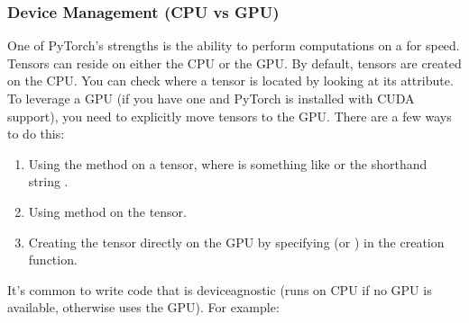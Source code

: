 \documentclass[letterpaper,10pt,english]{jupyterBook}
\begin{document}
\subsubsection{Device Management (CPU vs GPU)}
\label{\detokenize{04:device-management-cpu-vs-gpu}}
\sphinxAtStartPar
One of PyTorch’s strengths is the ability to perform computations on a  for speed. Tensors can reside on either the CPU or the GPU. By default, tensors are created on the CPU.
You can check where a tensor is located by looking at its  attribute. To leverage a GPU (if you have one and PyTorch is installed with CUDA support), you need to explicitly move tensors to the GPU. There are a few ways to do this:
\begin{enumerate}
%
\item {} 
\sphinxAtStartPar
Using the  method on a tensor, where  is something like  or the shorthand string .

\item {} 
\sphinxAtStartPar
Using  method on the tensor.

\item {} 
\sphinxAtStartPar
Creating the tensor directly on the GPU by specifying  (or ) in the creation function.

\end{enumerate}

\sphinxAtStartPar
It’s common to write code that is device\sphinxhyphen{}agnostic (runs on CPU if no GPU is available, otherwise uses the GPU). For example:
\end{document}
